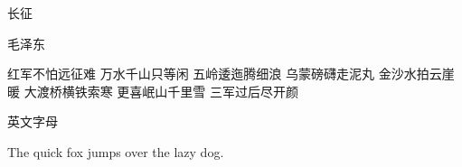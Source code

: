 \documentclass[a4paper,twoside]{article}
\begin{document}
\begin{center}
长\qquad\qquad 征

毛泽东

红军不怕远征难 万水千山只等闲
五岭逶迤腾细浪 乌蒙磅礴走泥丸
金沙水拍云崖暖 大渡桥横铁索寒
更喜岷山千里雪 三军过后尽开颜
  
\end{center}

\vfill
英文字母

The quick fox jumps over the lazy dog.
\end{document}
